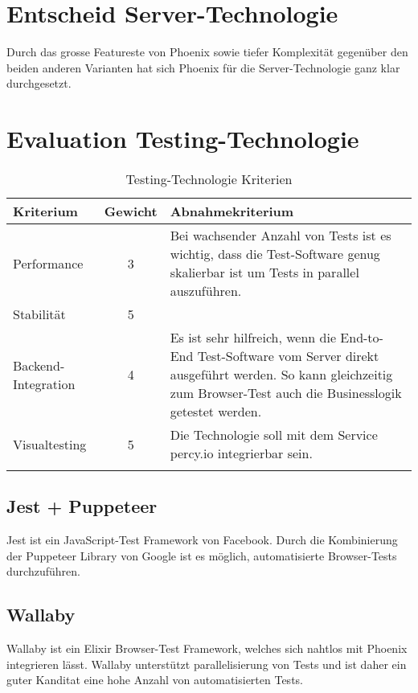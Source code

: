 \section{Entscheid Server-Technologie}\label{entscheid-server-technologie}

Durch das grosse Featureste von Phoenix sowie tiefer Komplexität gegenüber den
beiden anderen Varianten hat sich Phoenix für die Server-Technologie ganz klar
durchgesetzt.

\clearpage
\section{Evaluation Testing-Technologie}\label{evaluation-testing-technologie}

\begin{longtable}[]{@{}p{2cm}cp{10cm}@{}}
  \toprule
  \textbf{Kriterium}  & \textbf{Gewicht} & \textbf{Abnahmekriterium}\tabularnewline
  \midrule
  \endhead
  Performance         & 3                & Bei wachsender Anzahl von Tests ist es wichtig, dass die Test-Software genug skalierbar ist um Tests in parallel auszuführen.\tabularnewline
  \midrule
  Stabilität          & 5                & \tabularnewline
  \midrule
  Backend-Integration & 4                & Es ist sehr hilfreich, wenn die End-to-End Test-Software vom Server direkt ausgeführt werden. So kann gleichzeitig zum Browser-Test auch die Businesslogik getestet werden.\tabularnewline
  \midrule
  Visualtesting       & 5                & Die Technologie soll mit dem Service percy.io integrierbar sein.\tabularnewline
  \bottomrule
  \caption{Testing-Technologie Kriterien}
\end{longtable}

\subsection{Jest + Puppeteer}

Jest ist ein JavaScript-Test Framework von Facebook. Durch die Kombinierung der
Puppeteer Library von Google ist es möglich, automatisierte Browser-Tests
durchzuführen.

\subsection{Wallaby}

Wallaby ist ein Elixir Browser-Test Framework, welches sich nahtlos mit Phoenix
integrieren lässt. Wallaby unterstützt parallelisierung von Tests und ist daher
ein guter Kanditat eine hohe Anzahl von automatisierten Tests.

